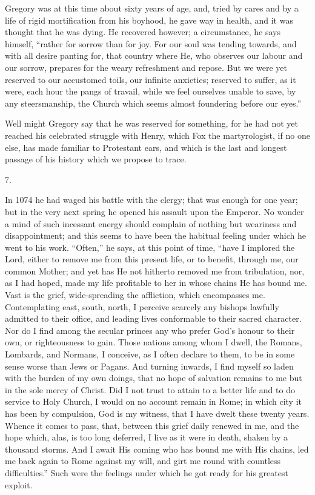 Gregory was at this time about sixty years of
age, and, tried by cares and by a life of rigid mortification from his
boyhood, he gave way in health, and it was thought that he was dying.
He recovered however; a circumstance, he says himself, ``rather for
sorrow than for joy. For our soul was tending towards, and with all
desire panting for, that country where He, who observes our labour and
our sorrow, prepares for the weary refreshment and repose. But we were
yet reserved to our accustomed toils, our infinite anxieties; reserved
to suffer, as it were, each hour the pangs of travail, while we feel
ourselves unable to save, by any steersmanship, the Church which seems
almost foundering before our eyes.''

Well might Gregory say that he was reserved for
something, for he had not yet reached his celebrated struggle with
Henry, which Fox the martyrologist, if no one else, has made familiar
to Protestant ears, and which is the last and longest passage of his
history which we propose to trace.

7.

In 1074 he had waged his battle with the clergy;
that was enough for one year; but in the very next spring he opened
his assault upon the Emperor. No wonder a mind of such incessant
energy should complain of nothing but weariness and disappointment;
and this seems to have been the habitual feeling under which he went
to his work. ``Often,'' he says, at this point of time, ``have I implored
the Lord, either to remove me from this present life, or to benefit,
through me, our common Mother; and yet has He not hitherto removed me
from tribulation, nor, as I had hoped, made my life profitable to her
in whose chains He has bound me. Vast is the grief, wide-spreading the
affliction, which encompasses me. Contemplating east, south, north, I
perceive scarcely any bishops lawfully admitted to their office, and
leading lives conformable to their sacred character. Nor do I find
among the secular princes any who prefer God's honour to their own, or
righteousness to gain. Those nations among whom I dwell, the Romans,
Lombards, and Normans, I conceive, as I often declare to them, to be
in some sense worse than Jews or Pagans. And turning inwards, I find
myself so laden with the burden of my own doings, that no hope of
salvation remains to me but in the sole mercy of Christ. Did I not
trust to attain to a better life and to do service to Holy Church, I
would on no account remain in Rome; in which city it has been by
compulsion, God is my witness, that I have dwelt these twenty years.
Whence it comes to pass, that, between this grief daily renewed in me,
and the hope which, alas, is too long deferred, I live as it were in
death, shaken by a thousand storms. And I await His coming who has
bound me with His chains, led me back again to Rome against my will,
and girt me round with countless difficulties.'' Such were the
feelings under which he got ready for his greatest exploit.

